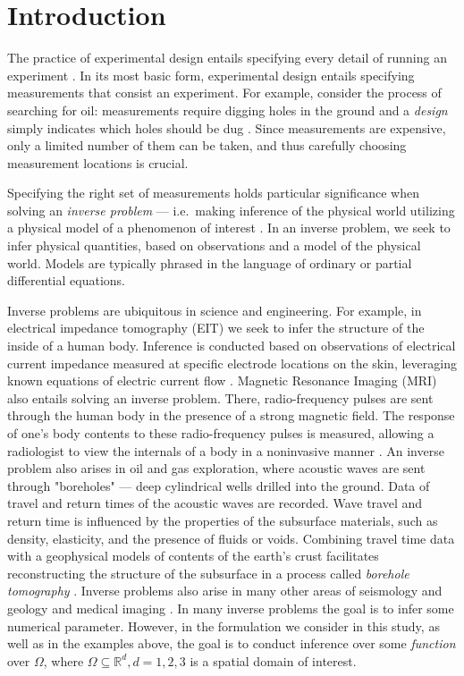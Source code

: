 \section{Introduction}\label{section:intro}
The practice of experimental design entails specifying every detail of
running an experiment \cite{chaloner1995}. In its most basic form,
experimental design entails specifying measurements that consist an
experiment. For example, consider the process of searching for oil:
measurements require digging holes in the ground and a \emph{design}
simply indicates which holes should be dug
\cite{horesh2008borehole}. Since measurements are expensive, only a
limited number of them can be taken, and thus carefully choosing
measurement locations is crucial.

Specifying the right set of measurements holds particular significance
when solving an \emph{inverse problem} --- i.e.~making inference of
the physical world utilizing a physical model of a phenomenon of
interest \cite{tarantola2005,kaipio2005}. In an inverse problem, we
seek to infer physical quantities, based on observations and a model
of the physical world. Models are typically phrased in the language of
ordinary or partial differential equations.

Inverse problems are ubiquitous in science and engineering. For
example, in electrical impedance tomography (EIT) we seek to infer the
structure of the inside of a human body. Inference is conducted based
on observations of electrical current impedance measured at specific
electrode locations on the skin, leveraging known equations of
electric current flow \cite{horesh2010impedance}. Magnetic Resonance
Imaging (MRI) also entails solving an inverse problem. There,
radio-frequency pulses are sent through the human body in the presence
of a strong magnetic field. The response of one's body contents to
these radio-frequency pulses is measured, allowing a radiologist to
view the internals of a body in a noninvasive manner
\cite{horesh2008mri}. An inverse problem also arises in oil and gas
exploration, where acoustic waves are sent through "boreholes" ---
deep cylindrical wells drilled into the ground. Data of travel and
return times of the acoustic waves are recorded. Wave travel and
return time is influenced by the properties of the subsurface
materials, such as density, elasticity, and the presence of fluids or
voids. Combining travel time data with a geophysical models of
contents of the earth's crust facilitates reconstructing the structure
of the subsurface in a process called \emph{borehole tomography}
\cite{horesh2008borehole}. Inverse problems also arise in many other
areas of seismology and geology \cite{rabinowitz1990, steinberg1995}
and medical imaging \cite{tarantola2005}. In many inverse problems the
goal is to infer some numerical parameter. However, in the formulation
we consider in this study, as well as in the examples above, the goal
is to conduct inference over some \emph{function} over $\Omega$, where
\(\Omega \subseteq \mathbb{R}^d, d=1,2,3\) is a spatial domain of
interest.

